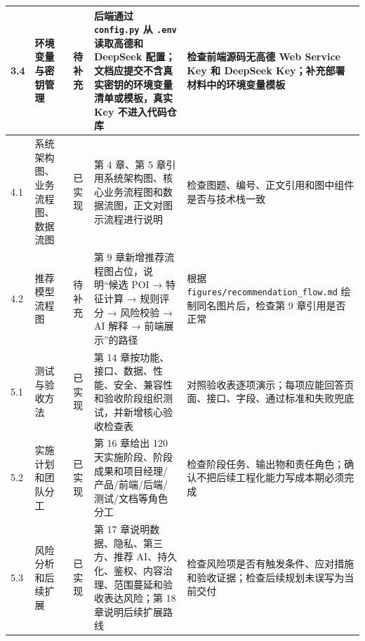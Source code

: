 \begin{longtable}{|p{0.6cm}|p{3.0cm}|p{1.7cm}|p{5.4cm}|p{3.7cm}|}
  \hline
  3.4 & 环境变量与密钥管理 & 待补充 & 后端通过 \texttt{config.py} 从 \texttt{.env} 读取高德和 DeepSeek 配置；文档应提交不含真实密钥的环境变量清单或模板，真实 Key 不进入代码仓库 & 检查前端源码无高德 Web Service Key 和 DeepSeek Key；补充部署材料中的环境变量模板 \\
  \hline
  4.1 & 系统架构图、业务流程图、数据流图 & 已实现 & 第 4 章、第 5 章引用系统架构图、核心业务流程图和数据流图，正文对图示流程进行说明 & 检查图题、编号、正文引用和图中组件是否与技术栈一致 \\
  \hline
  4.2 & 推荐模型流程图 & 待补充 & 第 9 章新增推荐流程图占位，说明“候选 POI → 特征计算 → 规则评分 → 风险校验 → AI 解释 → 前端展示”的路径 & 根据 \texttt{figures/recommendation\_flow.md} 绘制同名图片后，检查第 9 章引用是否正常 \\
  \hline
  5.1 & 测试与验收方法 & 已实现 & 第 14 章按功能、接口、数据、性能、安全、兼容性和验收阶段组织测试，并新增核心验收检查表 & 对照验收表逐项演示；每项应能回答页面、接口、字段、通过标准和失败兜底 \\
  \hline
  5.2 & 实施计划和团队分工 & 已实现 & 第 16 章给出 120 天实施阶段、阶段成果和项目经理/产品/前端/后端/测试/文档等角色分工 & 检查阶段任务、输出物和责任角色；确认不把后续工程化能力写成本期必须完成 \\
  \hline
  5.3 & 风险分析和后续扩展 & 已实现 & 第 17 章说明数据、隐私、第三方、推荐 AI、持久化、鉴权、内容治理、范围蔓延和验收表达风险；第 18 章说明后续扩展路线 & 检查风险项是否有触发条件、应对措施和验收证据；检查后续规划未误写为当前交付 \\
\end{longtable}
